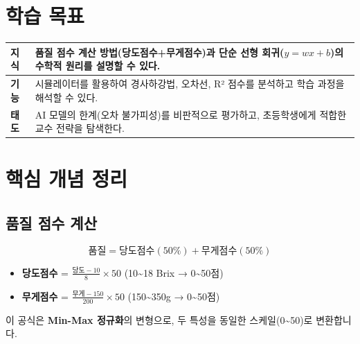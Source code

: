 \documentclass[11pt,a4paper]{article}
\begin{document}
\section{학습 목표}

\begin{center}
\begin{tabular}{|>{\centering\arraybackslash}p{1.5cm}|p{12.5cm}|}
\hline
\textbf{지식} & 품질 점수 계산 방법(당도점수+무게점수)과 단순 선형 회귀($y=wx+b$)의 수학적 원리를 설명할 수 있다. \\
\hline
\textbf{기능} & 시뮬레이터를 활용하여 경사하강법, 오차선, R² 점수를 분석하고 학습 과정을 해석할 수 있다. \\
\hline
\textbf{태도} & AI 모델의 한계(오차 불가피성)를 비판적으로 평가하고, 초등학생에게 적합한 교수 전략을 탐색한다. \\
\hline
\end{tabular}
\end{center}

\section{핵심 개념 정리}

\subsection{품질 점수 계산}

\begin{tcolorbox}[colback=lightcyan,colframe=teal,title=\textbf{\texttwemoji{triangular ruler} 품질 점수 공식}]
\begin{equation}
\text{품질} = \text{당도점수}(50\%) + \text{무게점수}(50\%)
\end{equation}

\begin{itemize}
    \item \textbf{당도점수} = $\displaystyle\frac{\text{당도} - 10}{8} \times 50$ \quad (10\textasciitilde18 Brix → 0\textasciitilde50점)
    \item \textbf{무게점수} = $\displaystyle\frac{\text{무게} - 150}{200} \times 50$ \quad (150\textasciitilde350g → 0\textasciitilde50점)
\end{itemize}

\vspace{0.2cm}
 이 공식은 \textbf{Min-Max 정규화}의 변형으로, 두 특성을 동일한 스케일(0\textasciitilde50)로 변환합니다.
\end{tcolorbox}
\end{document}
